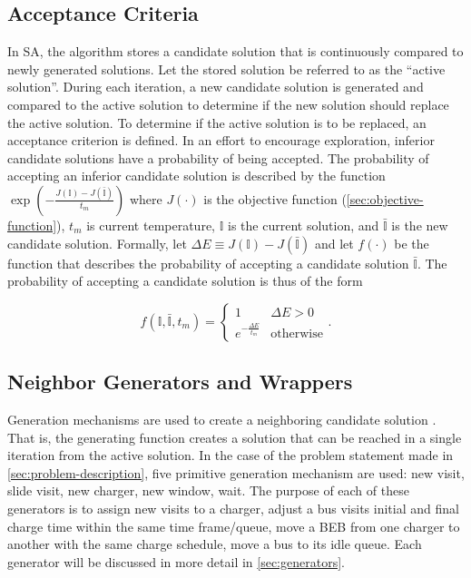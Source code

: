 \documentclass[energies,article,submit,moreauthors]{Definitions/mdpi}
\newcommand{\I}{\mathbb{I}}                 %
\begin{document}
\subsection{Acceptance Criteria}
\label{sec:acceptance}
In SA, the algorithm stores a candidate solution that is continuously compared to newly generated solutions. Let the
stored solution be referred to as the ``active solution''. During each iteration, a new candidate solution is generated
and compared to the active solution to determine if the new solution should replace the active solution. To determine if
the active solution is to be replaced, an acceptance criterion is defined. In an effort to encourage exploration,
inferior candidate solutions have a probability of being accepted. The probability of accepting an inferior candidate
solution is described by the function \(\exp(-\frac{J(\I) - J(\bar{\I})}{t_m})\) where \(J(\cdot)\) is the objective function
(\ref{sec:objective-function}), \(t_m\) is current temperature, \(\I\) is the current solution, and \(\bar{\I}\) is the new
candidate solution. Formally, let \(\Delta E \equiv J(\I) - J(\bar{\I})\) and let \(f(\cdot)\) be the function that describes the
probability of accepting a candidate solution \(\bar{\I}\). The probability of accepting a candidate solution is thus of
the form \cite{keller-2019-multi-objec}

\begin{equation}
\label{eq:candaccept}
f(\I,\bar{\I},t_m) =
\begin{cases}
  1                   & \Delta E > 0 \\
  e^{- \frac{\Delta E}{t_m}} & \text{otherwise}
\end{cases}\text{.}
\end{equation}

\subsection{Neighbor Generators and Wrappers}
\label{sec:generation-mechanisms}
Generation mechanisms are used to create a neighboring candidate solution \cite{gendreau-2018-handb-metah}. That is,
the generating function creates a solution that can be reached in a single iteration from the active solution. In the
case of the problem statement made in \ref{sec:problem-description}, five primitive generation mechanism are used: new visit,
slide visit, new charger, new window, wait. The purpose of each of these generators is to assign new visits to a
charger, adjust a bus visits initial and final charge time within the same time frame/queue, move a BEB from one charger
to another with the same charge schedule, move a bus to its idle queue. Each generator will be discussed in more detail
in \ref{sec:generators}.
\end{document}
